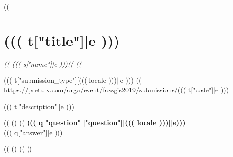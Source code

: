 \documentclass[a4paper]{scrartcl}
\begin{document}
\renewcommand{\arraystretch}{0}

\newlength\cardWidth
\setlength\cardWidth{13.3cm}
((%
  \section{((( t["title"]|e )))}
  
  \emph{%
    ((%
      ((( s["name"]|e )))((%
    ((%
  }
 
  \noindent ((( t["submission_type"][((( locale )))]|e ))) ((%
      \url{https://pretalx.com/orga/event/fossgis2019/submissions/((( t["code"]|e )))}

  \vspace{1\baselineskip}

  \vspace{1\baselineskip}
  \noindent ((( t["description"]|e )))

  \vspace{1\baselineskip}
  ((%
    ((%
        ((%
          \noindent \textbf{((( q["question"]["question"][((( locale )))]|e)))}\\
          ((( q["answer"]|e )))

        ((%
    ((%
  ((%
((%
\end{document}
